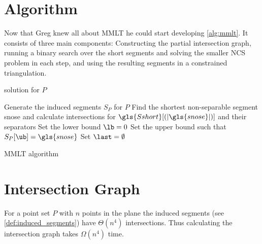 \section{Algorithm}
Now that Greg knew all about \gls{MMLT} he could start developing
\cref{alg:mmlt}. It consists of three main components: Constructing
the partial intersection graph, running a binary search over the short
segments and solving the smaller \gls{NCS} problem in each step, and
using the resulting segments in a constrained triangulation.

\begin{algorithm}
  \DontPrintSemicolon
   solution for \(P\)
  
  
  Generate the induced segments \(S_P\) for \(P\) \;
  Find the shortest non-separable segment \gls{snose}
  and calculate intersections for 
  \(\gls{Sshort}[(|\gls{snose}|)]\) and their separators \;
  Set the lower bound \(\lb = 0\) \;
  Set the upper bound \ub such that \(S_P[\ub] = \gls{snose}\) \;
  Set \(\last = \emptyset\) \;
  \caption{\label{alg:mmlt}\gls{MMLT} algorithm}
\end{algorithm}

\section{Intersection Graph}\label{sec:mmlt_intersection_graph}
For a point set \(P\) with \(n\) points in the plane 
the induced segments (see
\cref{def:induced_segments}) have \(\Theta(n^4)\) intersections.
\cite{quadrilaterals_bound} Thus calculating the intersection graph
takes \(\Omega(n^4)\) time.

